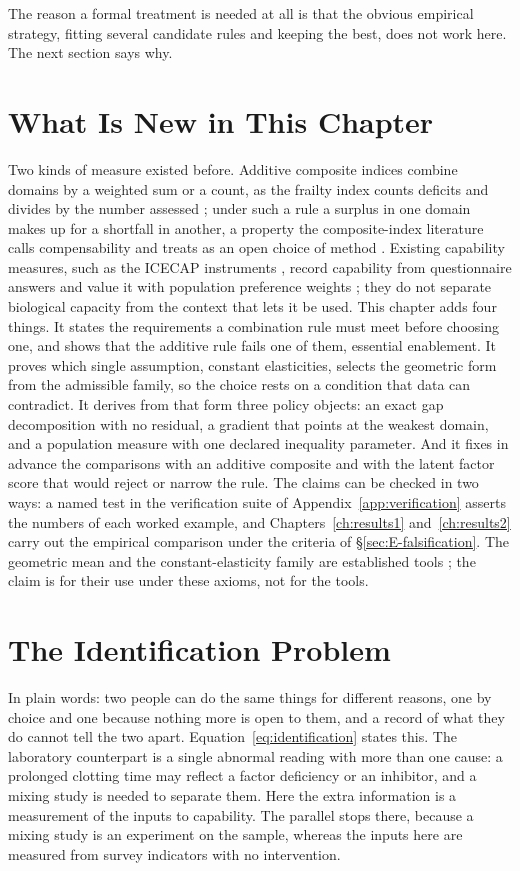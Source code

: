 The reason a formal treatment is needed at all is that the obvious empirical
strategy, fitting several candidate rules and keeping the best, does not work
here. The next section says why.

\section*{What Is New in This Chapter}
Two kinds of measure existed before. Additive composite indices combine
domains by a weighted sum or a count, as the frailty index counts deficits and
divides by the number assessed \citep{rockwood_mitnitski_2007}; under such a
rule a surplus in one domain makes up for a shortfall in another, a property
the composite-index literature calls compensability and treats as an open
choice of method \citep{greco_2019}. Existing capability measures, such as the
ICECAP instruments \citep{icecap_o,icecap_a}, record capability from
questionnaire answers and value it with population preference weights
\citep{coast_2008}; they do not separate biological capacity from the context
that lets it be used. This chapter adds four things. It states the
requirements a combination rule must meet before choosing one, and shows that
the additive rule fails one of them, essential enablement. It proves which
single assumption, constant elasticities, selects the geometric form from the
admissible family, so the choice rests on a condition that data can contradict.
It derives from that form three policy objects: an exact gap decomposition with
no residual, a gradient that points at the weakest domain, and a population
measure with one declared inequality parameter. And it fixes in advance the
comparisons with an additive composite and with the latent factor score that
would reject or narrow the rule. The claims can be checked in two ways: a named
test in the verification suite of Appendix~\ref{app:verification} asserts the
numbers of each worked example, and Chapters~\ref{ch:results1}
and~\ref{ch:results2} carry out the empirical comparison under the criteria of
\S\ref{sec:E-falsification}. The geometric mean and the constant-elasticity
family are established tools \citep{arrow_chenery_1961,cobb_douglas_1928}; the
claim is for their use under these axioms, not for the tools.

\section{The Identification Problem}
\label{sec:E-identification}
In plain words: two people can do the same things for different reasons, one
by choice and one because nothing more is open to them, and a record of what
they do cannot tell the two apart. Equation~\eqref{eq:identification} states
this. The laboratory counterpart is a single abnormal reading with more than one
cause: a prolonged clotting time may reflect a factor deficiency or an
inhibitor, and a mixing study is needed to separate them. Here the extra
information is a measurement of the inputs to capability. The parallel stops
there, because a mixing study is an experiment on the sample, whereas the
inputs here are measured from survey indicators with no intervention.


